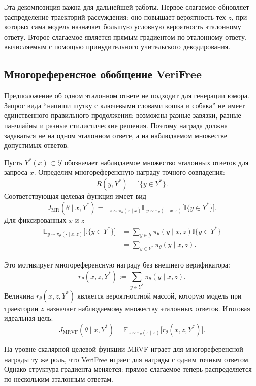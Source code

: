 Эта декомпозиция важна для дальнейшей работы. Первое слагаемое обновляет распределение траекторий рассуждения: оно повышает вероятность тех \(z\), при которых сама модель назначает большую условную вероятность эталонному ответу. Второе слагаемое является прямым градиентом по эталонному ответу, вычисляемым с помощью принудительного учительского декодирования.

\subsection{Многореференсное обобщение VeriFree}

Предположение об одном эталонном ответе не подходит для генерации юмора. Запрос вида ``напиши шутку с ключевыми словами кошка и собака'' не имеет единственного правильного продолжения: возможны разные завязки, разные панчлайны и разные стилистические решения. Поэтому награда должна задаваться не на одном эталонном ответе, а на наблюдаемом множестве допустимых ответов.

Пусть \(Y^{*}(x)\subset\mathcal{Y}\) обозначает наблюдаемое множество эталонных ответов для запроса \(x\). Определим многореференсную награду точного совпадения:
\[
    R(y,Y^{*})
    =
    \mathbb{I}\{y\in Y^{*}\}.
\]
Соответствующая целевая функция имеет вид
\[
    J_{\mathrm{MR}}(\theta\mid x,Y^{*})
    =
    \mathbb{E}_{z\sim\pi_{\theta}(z\mid x)}
    \mathbb{E}_{y\sim\pi_{\theta}(\cdot\mid x,z)}
    \big[
        \mathbb{I}\{y\in Y^{*}\}
        \big].
\]
Для фиксированных \(x\) и \(z\)
\begin{align*}
    \mathbb{E}_{y\sim\pi_{\theta}(\cdot\mid x,z)}
    \big[
        \mathbb{I}\{y\in Y^{*}\}
        \big]
     & =
    \sum_{y\in\mathcal{Y}}
    \pi_{\theta}(y\mid x,z)
    \mathbb{I}\{y\in Y^{*}\}
    \\
     & =
    \sum_{y\in Y^{*}}
    \pi_{\theta}(y\mid x,z).
\end{align*}

Это мотивирует многореференсную награду без внешнего верификатора:
\[
    r_{\theta}(x,z,Y^{*})
    :=
    \sum_{y\in Y^{*}}
    \pi_{\theta}(y\mid x,z).
\]
Величина \(r_{\theta}(x,z,Y^{*})\) является вероятностной массой, которую модель при траектории \(z\) назначает наблюдаемому множеству эталонных ответов. Итоговая идеальная цель:
\[
    J_{\mathrm{MRVF}}(\theta\mid x,Y^{*})
    =
    \mathbb{E}_{z\sim\pi_{\theta}(z\mid x)}
    \big[
        r_{\theta}(x,z,Y^{*})
        \big].
\]

На уровне скалярной целевой функции MRVF играет для многореференсной награды ту же роль, что VeriFree играет для награды с одним точным ответом. Однако структура градиента меняется: прямое слагаемое теперь распределяется по нескольким эталонным ответам.

